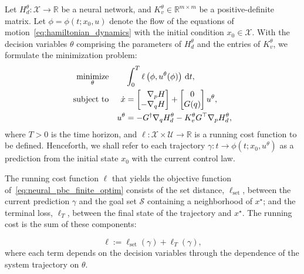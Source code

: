 Let $H_d^\theta: \mathcal{X} \to \mathbb{R}$ be a neural network, and
$K_v^\theta \in \mathbb{R}^{m \times m}$ be a positive-definite matrix. 
%
Let
$\phi = \phi \left(t; x_0, u \right)$ denote the flow of the equations of
motion~\eqref{eq:hamiltonian_dynamics} with the initial condition $x_0 \in
\mathcal{X}$. 
%
With the decision variables $\theta$ comprising the parameters of $H_d^\theta$
and the entries of $K_v^\theta$, we formulate the minimization problem:
%
\begin{equation}
    \begin{aligned}
        \underset{\theta}{\textrm{minimize}} 
        & & &\int_{0}^{T} \ell \left(\phi,u^{\theta}(\phi) \right) \, \dd t , \\%
        \textrm{subject to}
        & & \dot{x} &= \bmat{\phantom{-}\nabla_p H \\ -\nabla_q H} + \bmat{0 \\ G(q)}u^{\theta}, \\%
        & & u^{\theta} &= -G^{\dagger} \nabla_q H_d^{\theta} - K_v^{\theta} G^\top \nabla_p H_d^{\theta},%
    \end{aligned}
    \label{eq:neural_pbc_finite_optim}
\end{equation}
%
where $T>0$ is the time horizon, and $\ell: \mathcal{X} \times \mathcal{U}
\rightarrow \mathbb{R}$ is a running cost function to be defined. 
%
%
Henceforth, we shall refer to each trajectory $\gamma : t \to \phi(t; x_0,
u^\theta)$ as a prediction from the initial state $x_0$ with the current
control law.


The running cost function $\ell$ that yields the objective function
of~\eqref{eq:neural_pbc_finite_optim} consists of the set distance,
$\ell_{\textrm{set}}$, between the current prediction $\gamma$ and the goal set
$\mathcal{S}$ containing a neighborhood of $x^\star$; and the terminal loss,
$\ell_T$, between the final state of the trajectory and $x^\star$. The running
cost is the sum of these components:

%
\begin{equation}
    \ell := \ell_{\textrm{set}}(\gamma) + \ell_T\left(\gamma\right),
    \label{eq:deterministic_loss} 
\end{equation}
%
where each term depends on the decision variables through the
dependence of the system trajectory on $\theta$.


